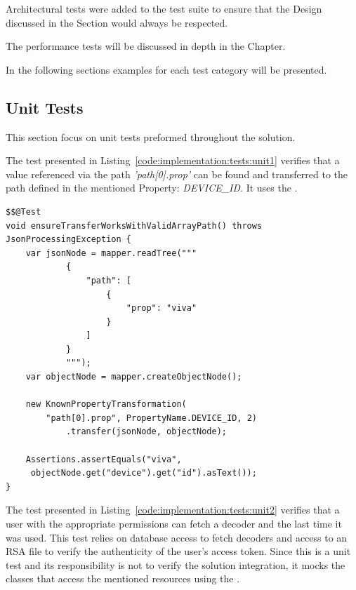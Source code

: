 Architectural tests were added to the test suite to ensure that the Design discussed in the  Section would always be respected.

The performance tests will be discussed in depth in the  Chapter.

In the following sections examples for each test category will be presented.

\subsection{Unit Tests}
\label{subsec:implementation:tests:unit}

This section focus on unit tests preformed throughout the solution.

The test presented in Listing~\ref{code:implementation:tests:unit1} verifies that a value referenced via the path \textit{'path[0].prop'} can be found and transferred to the path defined in the mentioned Property: \textit{DEVICE\_ID}.
It uses the .

\begin{lstlisting}[style=Java, caption=Unit Test Example in \textit{iot-core} package, label={code:implementation:tests:unit1}]
$$@Test
void ensureTransferWorksWithValidArrayPath() throws JsonProcessingException {
    var jsonNode = mapper.readTree("""
            {
                "path": [
                    {
                        "prop": "viva"
                    }
                ]
            }
            """);
    var objectNode = mapper.createObjectNode();

    new KnownPropertyTransformation(
        "path[0].prop", PropertyName.DEVICE_ID, 2)
            .transfer(jsonNode, objectNode);

    Assertions.assertEquals("viva",
     objectNode.get("device").get("id").asText());
}
\end{lstlisting}

The test presented in Listing~\ref{code:implementation:tests:unit2} verifies that a user with the appropriate permissions can fetch a decoder and the last time it was used. This test relies on database access to fetch decoders and access to an RSA file to verify the authenticity of the user's access token. Since this is a unit test and its responsibility is not to verify the solution integration, it mocks the classes that access the mentioned resources using the .

